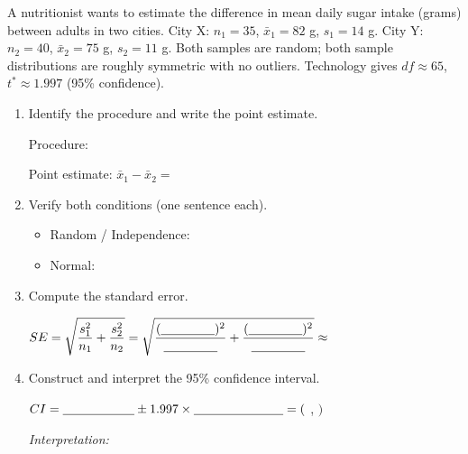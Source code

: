 \documentclass[10pt]{article}
\begin{document}
\namedateperiod

\vspace{0.15in}

A nutritionist wants to estimate the difference in mean daily sugar intake (grams) between
adults in two cities. City X: $n_1 = 35$, $\bar x_1 = 82$ g, $s_1 = 14$ g. \quad
City Y: $n_2 = 40$, $\bar x_2 = 75$ g, $s_2 = 11$ g.
Both samples are random; both sample distributions are roughly symmetric with no outliers.
Technology gives $df \approx 65$, $t^* \approx 1.997$ (95\% confidence).

\begin{enumerate}
  \item Identify the procedure and write the point estimate.

        Procedure: \blank{8cm}

        Point estimate: $\bar x_1 - \bar x_2 = $ \blank{3cm}

  \item Verify both conditions (one sentence each).
        \begin{itemize}
          \item Random / Independence: \writeline
          \item Normal: \writeline
        \end{itemize}

  \item Compute the standard error.

        $SE = \sqrt{\dfrac{s_1^2}{n_1} + \dfrac{s_2^2}{n_2}}
            = \sqrt{\dfrac{(\blank{1.5cm})^2}{\blank{1.5cm}} + \dfrac{(\blank{1.5cm})^2}{\blank{1.5cm}}} \approx$ \blank{2.5cm}

  \item Construct and interpret the 95\% confidence interval.

        $CI = \blank{2cm} \pm 1.997 \times \blank{2.5cm} = ($ \blank{2.5cm} , \blank{2.5cm} $)$

        \textit{Interpretation:} 
\end{enumerate}
\end{document}
